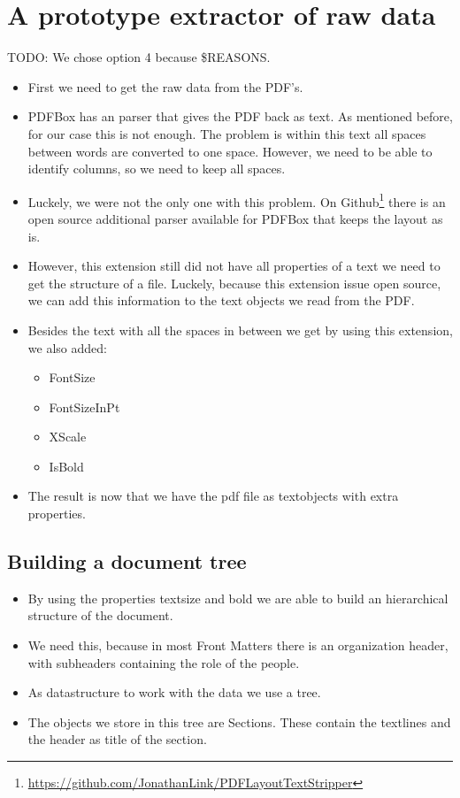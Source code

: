 \documentclass{ou-report}
\newcommand{\todo}[1]{{\color{red} TODO: #1}}
\begin{document}
\section{A prototype extractor of raw data}
\todo{We chose option 4 because \$REASONS.}
\begin{itemize}
    \item First we need to get the raw data from the PDF's.
    \item PDFBox has an parser that gives the PDF back as text. As mentioned
        before, for our case this is not enough. The problem is within this text
        all spaces between words are converted to one space. However, we need to
        be able to identify columns, so we need to keep all spaces.
    \item Luckely, we were not the only one with this problem. On 
        Github\footnote{\url{https://github.com/JonathanLink/PDFLayoutTextStripper}} 
        there is an open source additional parser available for PDFBox that 
        keeps the layout as is.
    \item However, this extension still did not have all properties of a text we
        need to get the structure of a file. Luckely, because this extension 
        issue open source, we can add this information to the text objects we 
        read from the PDF.
    \item Besides the text with all the spaces in between we get by using this 
        extension, we also added:
    \begin{itemize}
        \item FontSize
        \item FontSizeInPt
        \item XScale
        \item IsBold
    \end{itemize}
    \item The result is now that we have the pdf file as textobjects with 
        extra properties.
\end{itemize}

\subsection{Building a document tree}
\label{sec:lncs_parser_doc_tree}
\begin{itemize}
    \item By using the properties textsize and bold we are able to build an 
        hierarchical structure of the document. 
    \item We need this, because in most
        Front Matters there is an organization header, with subheaders 
        containing the role of the people.
    \item As datastructure to work with the data we use a tree.
    \item The objects we store in this tree are Sections. These contain the 
        textlines and the header as title of the section.
\end{itemize}
\end{document}
